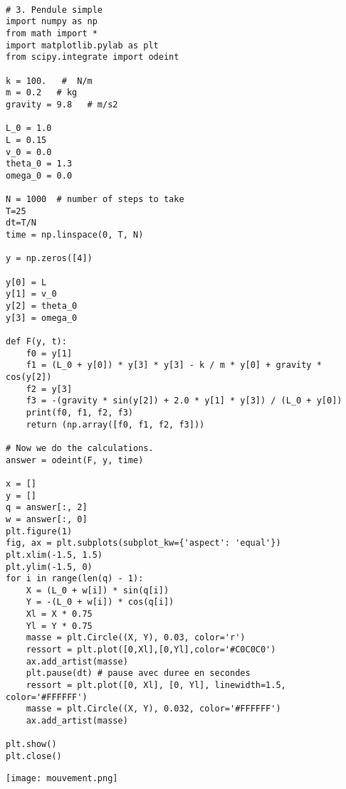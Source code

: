 \documentclass[a4paper]{article}
\begin{document}
\begin{lstlisting}

# 3. Pendule simple
import numpy as np
from math import *
import matplotlib.pylab as plt
from scipy.integrate import odeint

k = 100.   #  N/m
m = 0.2   # kg
gravity = 9.8   # m/s2

L_0 = 1.0
L = 0.15
v_0 = 0.0
theta_0 = 1.3
omega_0 = 0.0

N = 1000  # number of steps to take
T=25
dt=T/N
time = np.linspace(0, T, N)

y = np.zeros([4])

y[0] = L
y[1] = v_0
y[2] = theta_0
y[3] = omega_0

def F(y, t):
    f0 = y[1]
    f1 = (L_0 + y[0]) * y[3] * y[3] - k / m * y[0] + gravity * cos(y[2])
    f2 = y[3]
    f3 = -(gravity * sin(y[2]) + 2.0 * y[1] * y[3]) / (L_0 + y[0])
    print(f0, f1, f2, f3)
    return (np.array([f0, f1, f2, f3]))

# Now we do the calculations.
answer = odeint(F, y, time)

x = []
y = []
q = answer[:, 2]
w = answer[:, 0]
plt.figure(1)
fig, ax = plt.subplots(subplot_kw={'aspect': 'equal'})
plt.xlim(-1.5, 1.5)
plt.ylim(-1.5, 0)
for i in range(len(q) - 1):
    X = (L_0 + w[i]) * sin(q[i])
    Y = -(L_0 + w[i]) * cos(q[i])
    Xl = X * 0.75
    Yl = Y * 0.75
    masse = plt.Circle((X, Y), 0.03, color='r')
    ressort = plt.plot([0,Xl],[0,Yl],color='#C0C0C0')
    ax.add_artist(masse)
    plt.pause(dt) # pause avec duree en secondes
    ressort = plt.plot([0, Xl], [0, Yl], linewidth=1.5, color='#FFFFFF')
    masse = plt.Circle((X, Y), 0.032, color='#FFFFFF')
    ax.add_artist(masse)

plt.show()
plt.close()

\end{lstlisting}
 \begin{center}
 \texttt{[image: mouvement.png]}
\end{center}
\end{document}
